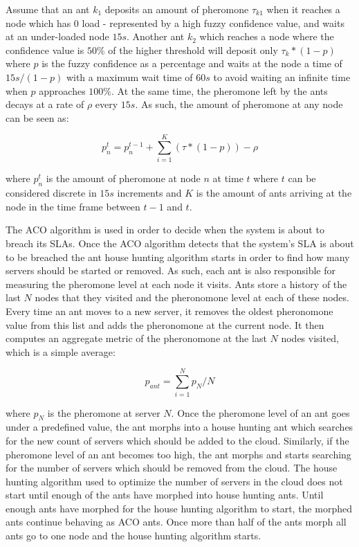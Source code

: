 Assume that an ant $k_{1}$ deposits an amount of pheromone $\tau_{k1}$ when it reaches a node which has 0 load - represented by a high fuzzy confidence value, and waits at an under-loaded node $15s$. Another ant $k_{2}$ which reaches a node where the confidence value is $50\%$ of the higher threshold will deposit only $\tau_{k} * (1 - p)$ where $p$ is the fuzzy confidence as a percentage and waits at the node a time of $15s/(1-p)$ with a maximum wait time of $60s$ to avoid waiting an infinite time when $p$ approaches $100\%$. At the same time, the pheromone left by the ants decays at a rate of $\rho$ every $15s$. As such, the amount of pheromone at any node can be seen as:

\begin{equation}
p^{t}_{n} = p^{t-1}_{n} + \sum_{i=1}^{K}(\tau * (1 - p)) - \rho
\end{equation}

where $p^{t}_{n}$ is the amount of pheromone at node $n$ at time $t$ where $t$ can be considered discrete in $15s$ increments and $K$ is the amount of ants arriving at the node in the time frame between $t-1$ and $t$.


The ACO algorithm is used in order to decide when the system is about to breach its SLAs. Once the ACO algorithm detects that the system's SLA is about to be breached the ant house hunting algorithm starts in order to find how many servers should be started or removed. As such, each ant is also responsible for measuring the pheromone level at each node it visits. Ants store a history of the last $N$ nodes that they visited and the pheronomone level at each of these nodes. Every time an ant moves to a new server, it removes the oldest pheronomone value from this list and adds the pheronomone at the current node. It then computes an aggregate metric of the pheronomone at the last $N$ nodes visited, which is a simple average:

\begin{equation}
p_{ant} = \sum_{i=1}^{N} p_{N} / N
\end{equation}

where $p_{N}$ is the pheromone at server $N$. Once the pheromone level of an ant goes under a predefined value, the ant morphs into a house hunting ant which searches for the new count of servers which should be added to the cloud. Similarly, if the pheromone level of an ant becomes too high, the ant morphs and starts searching for the number of servers which should be removed from the cloud. The house hunting algorithm used to optimize the number of servers in the cloud does not start until enough of the ants have morphed into house hunting ants. Until enough ants have morphed for the house hunting algorithm to start, the morphed ants continue behaving as ACO ants. Once more than half of the ants morph all ants go to one node and the house hunting algorithm starts.

